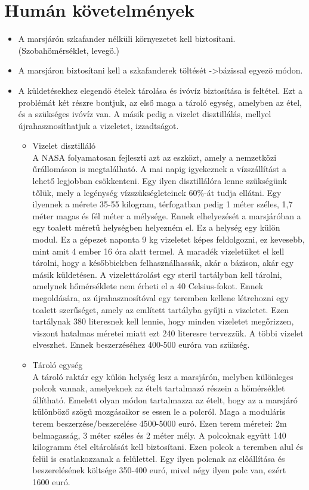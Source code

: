 \documentclass[12pt]{report}
\begin{document}
\section{Humán követelmények}
\begin{itemize}
  \item A marsjárón szkafander nélküli környezetet kell biztosítani. (Szobahömérséklet, levegö.)
  \item A marsjáron biztosítani kell a szkafanderek töltését ->bázissal egyezö módon.
  \item A küldetésekhez elegendö ételek tárolása és ivóvíz biztosítása is feltétel.
  Ezt a problémát két részre bontjuk, az első maga a tároló egység, amelyben az étel, és a szükséges ivóvíz van. A másik pedig a vizelet disztillálás, mellyel újrahasznosíthatjuk a vizeletet, izzadtságot.
  \begin{itemize}
    \item Vizelet disztilláló \\
    A NASA folyamatosan fejleszti azt az eszközt, amely a nemzetközi űrállomáson is megtalálható. A mai napig igyekeznek a vízszállítást a lehető legjobban csökkenteni. Egy ilyen disztillálóra lenne szükségünk tőlük, mely a legénység vízszükségleteinek 60\%-át tudja ellátni.
    Egy ilyennek a mérete 35-55 kilogram, térfogatban pedig 1 méter széles, 1,7 méter magas és fél méter a mélysége.
    Ennek elhelyezését a marsjáróban a egy toalett méretű helységben helyezném el. Ez a helység egy külön modul.
    Ez a gépezet naponta 9 kg vizeletet képes feldolgozni, ez kevesebb, mint amit 4 ember 16 óra alatt termel. A maradék vizeletüket el kell tárolni, hogy a későbbiekben felhasználhassák, akár a bázison, akár egy másik küldetésen. A vizelettárolást egy steril tartályban kell tárolni, amelynek hőmérséklete nem érheti el a 40 Celsius-fokot. Ennek megoldására, az újrahasznosítóval egy teremben kellene létrehozni egy toalett szerűséget, amely az említett tartályba gyűjti a vizeletet. Ezen tartálynak 380 literesnek kell lennie, hogy minden vizeletet megőrizzen, viszont hatalmas méretei miatt ezt 240 literesre tervezzük. A többi vizelet elveszhet. Ennek beszerzéséhez 400-500 euróra van szükség.
    \item Tároló egység \\
    A tároló raktár egy külön helység lesz a marsjárón, melyben különleges polcok vannak, amelyeknek az ételt tartalmazó részein a hőmérséklet állítható. Emelett olyan módon tartalmazza az ételt, hogy az a marsjáró különböző szögű mozgásaikor se essen le a polcról. Maga a moduláris terem beszerzése/beszerelése 4500-5000 euró. Ezen terem méretei: 2m belmagasság, 3 méter széles és 2 méter mély. A polcoknak együtt 140 kilogramm étel eltárolását kell biztosítani. Ezen polcok a teremben alul és felül is csatlakozzanak a felülettel. Egy ilyen polcnak az előállítása és beszerelésének költsége 350-400 euró, mivel négy ilyen polc van, ezért 1600 euró. \\

\end{itemize}
\end{itemize}
\end{document}
